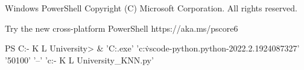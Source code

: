Windows PowerShell
Copyright (C) Microsoft Corporation. All rights reserved.

Try the new cross-platform PowerShell https://aka.ms/pscore6

PS C:\Users\kaamy\OneDrive - K L University\RPS>  & 'C:\Users\kaamy\AppData\Local\Programs\Python{}\python.exe' 'c:\Users\kaamy\.vscode\extensions\ms-python.python-2022.2.1924087327\pythonFiles\lib\python\debugpy\launcher' '50100' '--' 'c:\Users\kaamy\OneDrive - K L University\RPS\Python{}_KNN.py'
